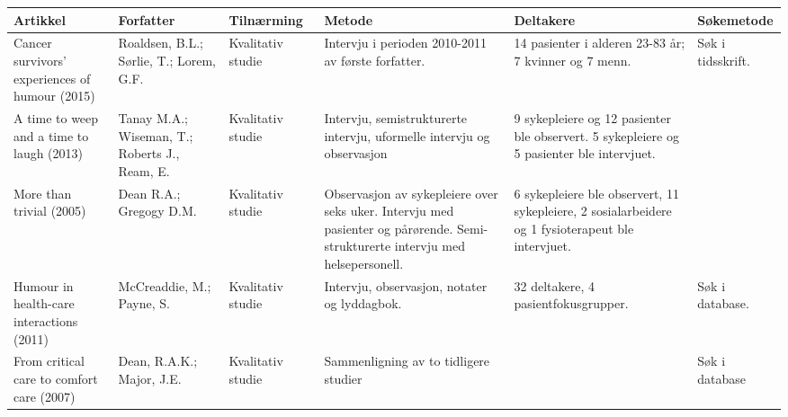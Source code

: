 \begin{table}
  \begin{tabularx}{\textwidth}{XXXXXX}
    \textbf{Artikkel} &
    \textbf{Forfatter} &
    \textbf{Tilnærming} &
    \textbf{Metode} &
    \textbf{Deltakere} &
    \textbf{Søkemetode}
    \\ \hline
    Cancer survivors’ experiences of humour (2015) &
    Roaldsen, B.L.; S{\o}rlie, T.; Lorem, G.F.  &
    Kvalitativ studie &
    Intervju i perioden 2010-2011 av første forfatter. &
    14 pasienter i alderen 23-83 år; 7 kvinner og 7 menn. &
    Søk i tidsskrift.
    \\ \hline
  	A time to weep and a time to laugh (2013) &
    Tanay M.A.; Wiseman, T.; Roberts J., Ream, E. &
    Kvalitativ studie &
    Intervju, semistrukturerte intervju, uformelle intervju og observasjon &
    9 sykepleiere og 12 pasienter ble observert. 5 sykepleiere og 5 pasienter
    ble intervjuet.
    \\ \hline
    More than trivial (2005) &
    Dean R.A.; Gregogy D.M. &
    Kvalitativ studie &
    Observasjon av sykepleiere over seks uker. Intervju med pasienter og
    pårørende. Semi-strukturerte intervju med helsepersonell. &
    6 sykepleiere ble observert, 11 sykepleiere, 2 sosialarbeidere og 1
    fysioterapeut ble intervjuet.
    \\ \hline
    Humour in health-care interactions (2011) &
    McCreaddie, M.; Payne, S. &
    Kvalitativ studie &
    Intervju, observasjon, notater og lyddagbok. &
    32 deltakere, 4 pasientfokusgrupper. &
    Søk i database.
    \\ \hline
  	From critical care to comfort care (2007) &
    Dean, R.A.K.; Major, J.E. &
    Kvalitativ studie &
    Sammenligning av to tidligere studier &
    &
    Søk i database
    \\ \hline
  \end{tabularx}
\end{table}
